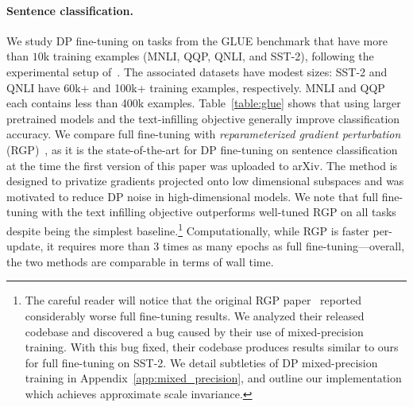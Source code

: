 \paragraph{Sentence classification.}
We study DP fine-tuning on tasks from the GLUE benchmark that have more than $10$k training examples (MNLI, QQP, QNLI, and SST-2), following the experimental setup of~\cite{yu2021large}. 
The associated datasets have modest sizes: SST-2 and QNLI have 60k+ and 100k+ training examples, respectively. MNLI and QQP each contains less than 400k examples. 
Table~\ref{table:glue} shows that using larger pretrained models and the text-infilling objective generally improve classification accuracy. 
We compare full fine-tuning with \textit{reparameterized gradient perturbation} (RGP)~\citep{yu2021large}, as it is the state-of-the-art for DP fine-tuning on sentence classification at the time the first version of this paper was uploaded to arXiv. 
The method is designed to privatize gradients projected onto low dimensional subspaces and was motivated to reduce DP noise in high-dimensional models. 
We note that full fine-tuning with the text infilling objective outperforms well-tuned RGP on all tasks despite being the simplest baseline.\footnote{The careful reader will notice that the original RGP paper~\citep{yu2021large} reported considerably worse full fine-tuning results. We analyzed their released codebase and discovered a bug caused by their use of mixed-precision training. 
With this bug fixed, their codebase produces results similar to ours for full fine-tuning on SST-2. 
We detail subtleties of DP mixed-precision training in Appendix~\ref{app:mixed_precision}, and outline our implementation which achieves approximate scale invariance.
}
Computationally, while RGP is faster per-update, it requires more than 3 times as many epochs as full fine-tuning---overall, the two methods are comparable in terms of wall time. 



